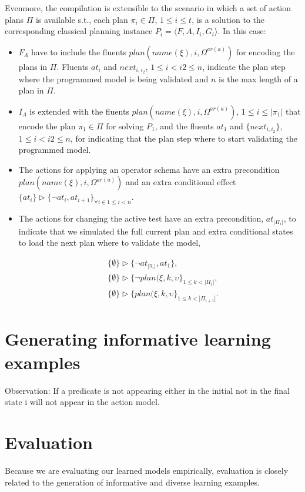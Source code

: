 \documentclass[letterpaper]{article} %
\newcommand{\tup}[1]{{\langle #1 \rangle}}
\begin{document}
Evenmore, the compilation is extensible to the scenario in which a set of action plans $\Pi$ is available s.t., each plan $\pi_i\in \Pi$, {\small $1\leq i\leq t$}, is a solution to the corresponding classical planning instance $P_i=\tup{F,A,I_i,G_i}$. In this case:
\begin{itemize}
\item $F_{\Lambda}$ have to include the fluents $plan(name(\xi),i,\Omega^{ar(a)})$ for encoding the plans in $\Pi$. Fluents $at_i$ and $next_{i,i_2}$, {\small $1\leq i<i2\leq n$}, indicate the plan step where the programmed model is being validated and $n$ is the max length of a plan in $\Pi$.
\item $I_{\Lambda}$ is extended with the fluents $plan(name(\xi),i,\Omega^{ar(a)})$, {\small $1\leq i\leq |\pi_1|$} that encode the plan $\pi_1\in \Pi$ for solving $P_1$, and the fluents $at_1$ and $\{next_{i,i_2}\}$, {\small $1\leq i<i2\leq n$}, for indicating that the plan step where to start validating the programmed model.
\item The actions for applying an operator schema have an extra precondition $plan(name(\xi),i,\Omega^{ar(a)})$ and an extra conditional effect $\{at_{i}\}\rhd\{\neg at_{i},at_{i+1}\}_{\forall i\in 1\leq i< n}$.
\item The actions for changing the active test have an extra precondition, $at_{|\Pi_i|}$, to indicate that we simulated the full current plan and extra conditional states to load the next plan where to validate the model,
\begin{small}
\begin{align*}
&\{\emptyset\}\rhd\{\neg at_{|\pi_i|},at_1\},\\
&\{\emptyset\}\rhd\{\neg plan(\xi,k,\upsilon\}_{1\leq k<|\Pi_i|},\\
&\{\emptyset\}\rhd\{plan(\xi,k,\upsilon\}_{1\leq k<|\Pi_{i+1}|}.
\end{align*}
\end{small}
\end{itemize}



\section{Generating informative learning examples}
Observation: If a predicate is not appearing either in the initial not in the final state i will not appear in the action model. 


\section{Evaluation}
Because we are evaluating our learned models empirically, evaluation is closely related to the generation of informative and diverse learning examples.
\end{document}
